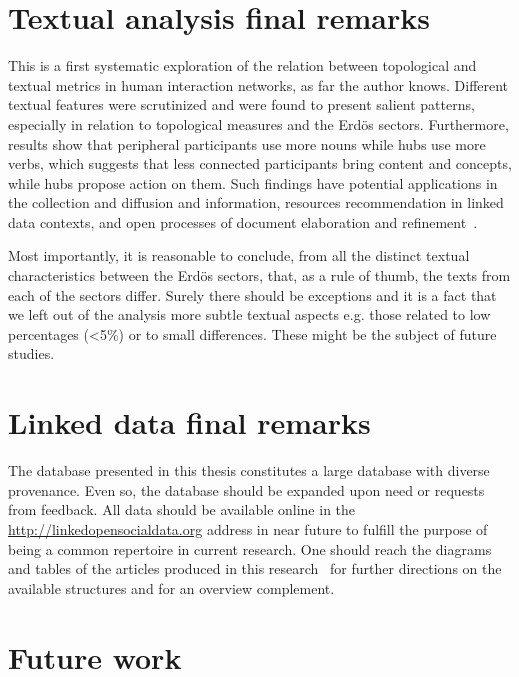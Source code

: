 \section{Textual analysis final remarks}\label{sec:remarks}
This is a first systematic exploration of the relation between topological and textual
metrics in human interaction networks, as far the author knows.
Different textual features were scrutinized and were found to present
salient patterns, especially in relation to topological measures and the Erd\"os sectors.
Furthermore, results show that peripheral participants use more nouns while hubs use more verbs,
which suggests that less connected participants bring content and concepts,
while hubs propose action on them.
Such findings have potential applications in the collection and diffusion and information,
resources recommendation in linked data contexts,
and open processes of document elaboration and refinement~\cite{ensaio,ops,opa,stab,pnud4,pnud3}.

Most importantly, it is reasonable to conclude, from all the distinct textual characteristics
between the Erd\"os sectors, that, as a rule of thumb, the texts from each of the sectors differ.
Surely there should be exceptions and it is a fact that we left out of the analysis
more subtle textual aspects e.g. those related to low percentages (<5\%) or to small
differences.
These might be the subject of future studies.

\section{Linked data final remarks}
The database presented in this thesis
constitutes a large database with diverse provenance.
Even so, the database should be expanded upon need or requests from feedback.
All data should be available online in the \url{http://linkedopensocialdata.org}
address in near future to fulfill the purpose of being a common
repertoire in current research.
One should reach the diagrams and tables of the 
articles produced in this research~\cite{stab,rcText,versinus,losd}
for further directions
on the available structures and for an overview complement.


\section{Future work}\label{sec:fw}

